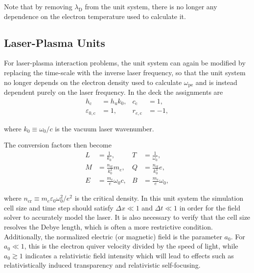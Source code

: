 \documentclass[twocolumn,10pt]{article}
\newcommand{\ncrit}{n_{\mathrm{cr}}}
\newcommand{\ldebye}{\lambda_{\mathrm{D}}}
\begin{document}
\noindent Note that by removing $\ldebye$ from the unit system, there is no longer any dependence on the electron temperature used to calculate it.

\subsection{Laser-Plasma Units}

For laser-plasma interaction problems, the unit system can again be modified by replacing the time-scale with the inverse laser frequency, so that the unit system no longer depends on the electron density used to calculate $\omega_{\mathrm{pe}}$ and is instead dependent purely on the laser frequency.
In the deck the assignments are
\begin{align*}
	h_{\mathrm{c}}             &= h_{\mathrm{u}}k_0, &
	c_{\mathrm{c}}             &= 1,             \\
	\varepsilon_{0,\mathrm{c}} &= 1,             &
	r_{e,\mathrm{c}}           &= -1,
\end{align*}

\noindent where $k_0 \equiv \omega_0/c$ is the vacuum laser wavenumber.

The conversion factors then become
\begin{align*}
	L &= \frac{1}{k_0},           &
	T &= \frac{1}{\omega_0},      \\
	M &= \frac{\ncrit}{k_0^3}m_e, &
	Q &= \frac{\ncrit}{k_0^3}e,   \\
	E &= \frac{m_e}{e}\omega_0 c, &
	B &= \frac{m_e}{e}\omega_0,
\end{align*}

where $\ncrit \equiv m_e\varepsilon_0\omega_0^2/e^2$ is the critical density.
In this unit system the simulation cell size and time step should satisfy $\Delta x \ll 1$ and $\Delta t \ll 1$ in order for the field solver to accurately model the laser.
It is also necessary to verify that the cell size resolves the Debye length, which is often a more restrictive condition.
Additionally, the normalized electric (or magnetic) field is the parameter $a_0$.
For $a_0 \ll 1$, this is the electron quiver velocity divided by the speed of light, while $a_0 \gtrsim 1$ indicates a relativistic field intensity which will lead to effects such as relativistically induced transparency and relativistic self-focusing.
\end{document}
